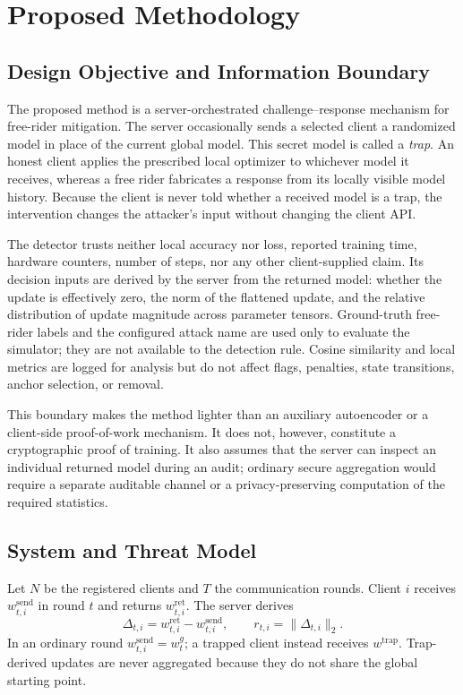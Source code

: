 \chapter{Proposed Methodology}
\label{sec:proposed-methodology}

\section{Design Objective and Information Boundary}

The proposed method is a server-orchestrated challenge--response mechanism for free-rider mitigation. The server occasionally sends a selected client a randomized model in place of the current global model. This secret model is called a \emph{trap}. An honest client applies the prescribed local optimizer to whichever model it receives, whereas a free rider fabricates a response from its locally visible model history. Because the client is never told whether a received model is a trap, the intervention changes the attacker's input without changing the client API.

The detector trusts neither local accuracy nor loss, reported training time, hardware counters, number of steps, nor any other client-supplied claim. Its decision inputs are derived by the server from the returned model: whether the update is effectively zero, the norm of the flattened update, and the relative distribution of update magnitude across parameter tensors. Ground-truth free-rider labels and the configured attack name are used only to evaluate the simulator; they are not available to the detection rule. Cosine similarity and local metrics are logged for analysis but do not affect flags, penalties, state transitions, anchor selection, or removal.

This boundary makes the method lighter than an auxiliary autoencoder or a client-side proof-of-work mechanism. It does not, however, constitute a cryptographic proof of training. It also assumes that the server can inspect an individual returned model during an audit; ordinary secure aggregation would require a separate auditable channel or a privacy-preserving computation of the required statistics.

\section{System and Threat Model}

Let $N$ be the registered clients and $T$ the communication rounds. Client $i$ receives $w^{\mathrm{send}}_{t,i}$ in round $t$ and returns $w^{\mathrm{ret}}_{t,i}$. The server derives
\begin{equation}
\Delta_{t,i}=w^{\mathrm{ret}}_{t,i}-w^{\mathrm{send}}_{t,i},
\qquad r_{t,i}=\lVert\Delta_{t,i}\rVert_2.
\end{equation}
In an ordinary round $w^{\mathrm{send}}_{t,i}=w^g_t$; a trapped client instead receives $w^{\mathrm{trap}}$. Trap-derived updates are never aggregated because they do not share the global starting point.

